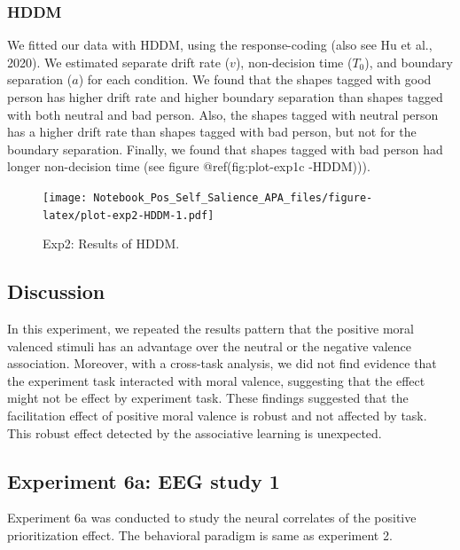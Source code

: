 \documentclass[
  english,
  man]{apa6}
\begin{document}
\hypertarget{hddm-3}{%
\subsubsection{HDDM}\label{hddm-3}}

We fitted our data with HDDM, using the response-coding (also see Hu et al., 2020). We estimated separate drift rate (\(v\)), non-decision time (\(T_{0}\)), and boundary separation (\(a\)) for each condition. We found that the shapes tagged with good person has higher drift rate and higher boundary separation than shapes tagged with both neutral and bad person. Also, the shapes tagged with neutral person has a higher drift rate than shapes tagged with bad person, but not for the boundary separation. Finally, we found that shapes tagged with bad person had longer non-decision time (see figure @ref(fig:plot-exp1c
-HDDM))).

\begin{figure}
\centering
\texttt{[image: Notebook\_Pos\_Self\_Salience\_APA\_files/figure-latex/plot-exp2-HDDM-1.pdf]}
\caption{\label{fig:plot-exp2-HDDM}Exp2: Results of HDDM.}
\end{figure}

\hypertarget{discussion-1}{%
\subsection{Discussion}\label{discussion-1}}

In this experiment, we repeated the results pattern that the positive moral valenced stimuli has an advantage over the neutral or the negative valence association. Moreover, with a cross-task analysis, we did not find evidence that the experiment task interacted with moral valence, suggesting that the effect might not be effect by experiment task.
These findings suggested that the facilitation effect of positive moral valence is robust and not affected by task. This robust effect detected by the associative learning is unexpected.

\hypertarget{experiment-6a-eeg-study-1}{%
\subsection{Experiment 6a: EEG study 1}\label{experiment-6a-eeg-study-1}}

Experiment 6a was conducted to study the neural correlates of the positive prioritization effect. The behavioral paradigm is same as experiment 2.
\end{document}
